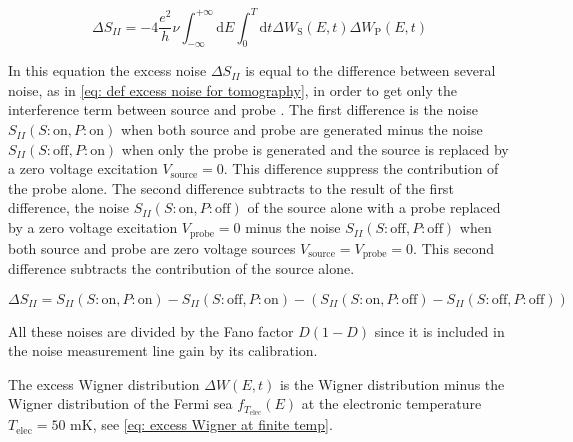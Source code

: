\begin{equation}
\Delta S_{II} = -4\frac{e^{2}}{h}\nu\int_{-\infty}^{+\infty}\mathrm{d}E\int_{0}^{T}\mathrm{d}t \Delta W_{\mathrm{S}}\left(E,t\right)\Delta W_{\mathrm{P}}\left(E,t\right) \label{eq: excess shot noise and overlap}
\end{equation}

In this equation the excess noise $\Delta S_{II}$ is equal to the difference between several noise, as in \eqref{eq: def excess noise for tomography}, in order to get only the interference term between source and probe \cite{marguerite2017two}.
The first difference is the noise $S_{II}\left(S:\mathrm{on},P:\mathrm{on}\right)$ when both source and probe are generated minus the noise $S_{II}\left(S:\mathrm{off},P:\mathrm{on}\right)$ when only the probe is generated and the source is replaced by a zero voltage excitation $V_{\mathrm{source}} = 0$.
This difference suppress the contribution of the probe alone.
The second difference subtracts to the result of the first difference, the noise $S_{II}\left(S:\mathrm{on},P:\mathrm{off}\right)$ of the source alone with a probe replaced by a zero voltage excitation $V_{\mathrm{probe}} = 0$ minus the noise $S_{II}\left(S:\mathrm{off},P:\mathrm{off}\right)$ when both source and probe are zero voltage sources $V_{\mathrm{source}} = V_{\mathrm{probe}} = 0$.
This second difference subtracts the contribution of the source alone.

\begin{equation}
\Delta S_{II} = S_{II}\left(S:\mathrm{on},P:\mathrm{on}\right)-S_{II}\left(S:\mathrm{off},P:\mathrm{on}\right)-\left(S_{II}\left(S:\mathrm{on},P:\mathrm{off}\right)-S_{II}\left(S:\mathrm{off},P:\mathrm{off}\right)\right) \label{eq: def excess noise for tomography}
\end{equation}

All these noises are divided by the Fano factor $D\left(1-D\right)$ since it is included in the noise measurement line gain by its calibration.

The excess Wigner distribution $\Delta W\left(E,t\right)$ is the Wigner distribution minus the Wigner distribution of the Fermi sea $f_{T_{\mathrm{elec}}}\left(E\right)$ at the electronic temperature $T_{\mathrm{elec}}=50$ mK, see \eqref{eq: excess Wigner at finite temp}.

